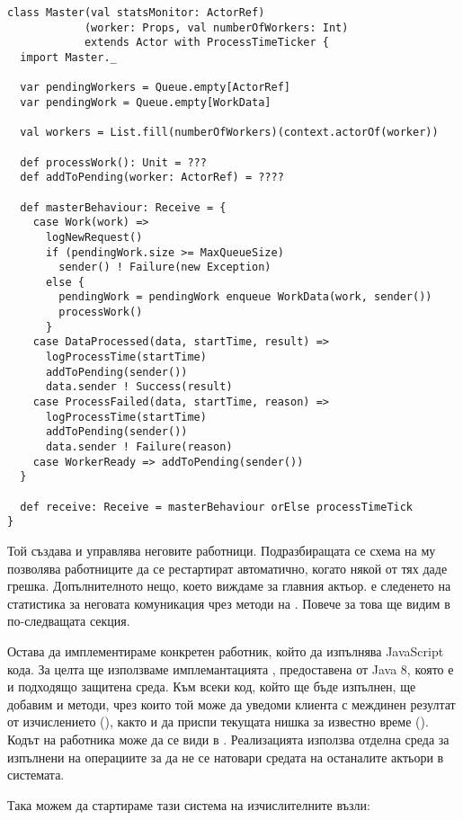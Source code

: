 \begin{lstlisting}
class Master(val statsMonitor: ActorRef)
            (worker: Props, val numberOfWorkers: Int)
            extends Actor with ProcessTimeTicker {
  import Master._
  
  var pendingWorkers = Queue.empty[ActorRef]
  var pendingWork = Queue.empty[WorkData]
  
  val workers = List.fill(numberOfWorkers)(context.actorOf(worker))
  
  def processWork(): Unit = ???
  def addToPending(worker: ActorRef) = ????
  
  def masterBehaviour: Receive = {
    case Work(work) =>
      logNewRequest()
      if (pendingWork.size >= MaxQueueSize)
        sender() ! Failure(new Exception)
      else {
        pendingWork = pendingWork enqueue WorkData(work, sender())
        processWork()
      }
    case DataProcessed(data, startTime, result) =>
      logProcessTime(startTime)
      addToPending(sender())
      data.sender ! Success(result)
    case ProcessFailed(data, startTime, reason) =>
      logProcessTime(startTime)
      addToPending(sender())
      data.sender ! Failure(reason)
    case WorkerReady => addToPending(sender())
  }
  
  def receive: Receive = masterBehaviour orElse processTimeTick
}
\end{lstlisting}

Той създава и управлява неговите работници. Подразбиращата се схема на  му позволява работниците да се рестартират автоматично, когато някой от тях даде грешка. Допълнителното нещо, което виждаме за главния актьор. е следенето на статистика за неговата комуникация чрез методи на . Повече за това ще видим в по-следващата секция.

Остава да имплементираме конкретен работник, който да изпълнява JavaScript кода. За целта ще използваме имплемантацията , предоставена от Java 8, която е и подходящо защитена среда. Към всеки код, който ще бъде изпълнен, ще добавим и методи, чрез които той може да уведоми клиента с междинен резултат от изчислението (), както и да приспи текущата нишка за известно време (). Кодът на работника може да се види в . Реализацията използва отделна среда за изпълнени на операциите за да не се натовари средата на останалите актьори в системата.

Така можем да стартираме тази система на изчислителните възли:

